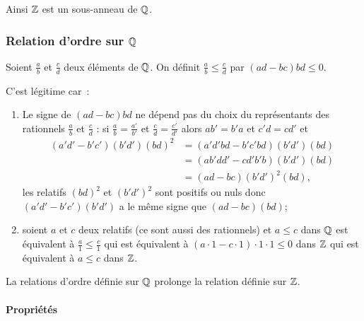 Ainsi \(\mathbb{Z}\) est un sous-anneau de \(\mathbb{Q}\).

\subsubsection{Relation d'ordre sur \(\mathbb{Q}\)}

\begin{defdef}
  Soient \(\frac{a}{b}\) et \(\frac{c}{d}\) deux éléments de \(\mathbb{Q}\). On définit \(\frac{a}{b} \leqslant \frac{c}{d}\) par \((ad-bc)bd \leqslant 0\).
\end{defdef}

C'est légitime car~:
\begin{enumerate}
\item Le signe de \((ad-bc)bd\) ne dépend pas du choix du représentants des rationnels \(\frac{a}{b}\) et \(\frac{c}{d}\) : si \(\frac{a}{b}=\frac{a'}{b'}\) et \(\frac{c}{d} = \frac{c'}{d'}\) alors \(ab'=b'a\) et \(c'd=cd'\) et
  \begin{align}
    (a'd'-b'c')(b'd')(bd)^2&=(a'd'bd -b'c'bd)(b'd')(bd)\\
    &=(ab'dd'-cd'b'b)(b'd')(bd)\\
    &=(ad-bc)(b'd')^2(bd),
  \end{align}
  les relatifs \((bd)^2\) et \((b'd')^2\) sont positifs ou nuls donc \((a'd'-b'c')(b'd')\) a le même signe que \((ad-bc)(bd)\);
\item soient \(a\) et \(c\) deux relatifs (ce sont aussi des rationnels) et \(a \leqslant c\) dans \(\mathbb{Q}\) est équivalent à \(\frac{a}{1} \leqslant \frac{c}{1}\) qui est équivalent à \((a\cdot 1-c \cdot 1)\cdot 1 \cdot 1 \leqslant 0\) dans \(\mathbb{Z}\) qui est équivalent à \(a \leqslant c\) dans \(\mathbb{Z}\).
\end{enumerate}

La relations d'ordre définie sur \(\mathbb{Q}\) prolonge la relation définie sur \(\mathbb{Z}\).

\paragraph{Propriétés}

